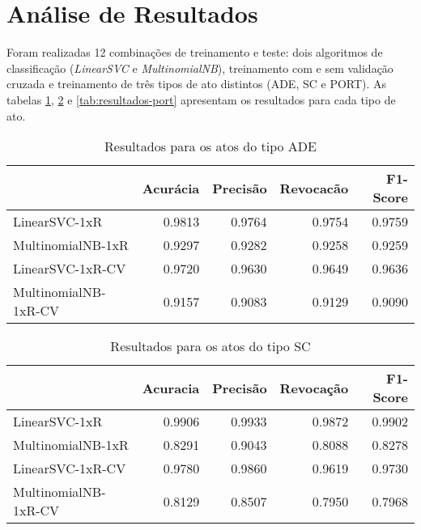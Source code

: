 \section{Análise de Resultados}

Foram realizadas 12 combinações de treinamento e teste: dois algoritmos de classificação (\textit{LinearSVC} e \textit{MultinomialNB}), treinamento com e sem validação cruzada e treinamento de três tipos de ato distintos (ADE, SC e PORT). As tabelas \ref{tab:resultados-ade}, \ref{tab:resultados-sc} e \ref{tab:resultados-port} apresentam os resultados para cada tipo de ato.

\begin{table}[h]
\caption{Resultados para os atos do tipo ADE}
\label{tab:resultados-ade}
	\begin{center}
	\begin{tabular}{lrrrr}
		\toprule
		{} &  Acurácia &  Precisão &  Revocacão &      F1-Score \\
		\midrule
		LinearSVC-1xR        &    0.9813 &    0.9764 &     0.9754 &  0.9759 \\
		MultinomialNB-1xR    &    0.9297 &    0.9282 &     0.9258 &  0.9259 \\
		LinearSVC-1xR-CV     &    0.9720 &    0.9630 &     0.9649 &  0.9636 \\
		MultinomialNB-1xR-CV &    0.9157 &    0.9083 &     0.9129 &  0.9090 \\
		\bottomrule
	\end{tabular}
	\end{center}		
\end{table}

\begin{table}[h]
\caption{Resultados para os atos do tipo SC}
\label{tab:resultados-sc}
	\begin{center}
	\begin{tabular}{lrrrr}
		\toprule
		{} &  Acuracia &  Precisão &  Revocação &      F1-Score \\
		\midrule
		LinearSVC-1xR        &    0.9906 &    0.9933 &     0.9872 &  0.9902 \\
		MultinomialNB-1xR    &    0.8291 &    0.9043 &     0.8088 &  0.8278 \\
		LinearSVC-1xR-CV     &    0.9780 &    0.9860 &     0.9619 &  0.9730 \\
		MultinomialNB-1xR-CV &    0.8129 &    0.8507 &     0.7950 &  0.7968 \\
		\bottomrule
	\end{tabular}
	\end{center}		
\end{table}

